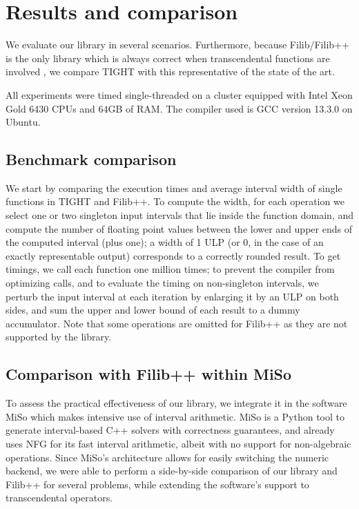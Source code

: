 \section{Results and comparison}
\label{sec:results}
We evaluate our library in several scenarios. Furthermore, because Filib/Filib++ is the only library which is always correct when transcendental functions are involved \cite{tang2022}, we compare TIGHT with this representative of the state of the art.

All experiments were timed single-threaded on a cluster equipped with Intel Xeon Gold 6430 CPUs and 64GB of RAM.
The compiler used is GCC version 13.3.0 on Ubuntu.

\subsection{Benchmark comparison}
We start by comparing the execution times and average interval width of single functions in TIGHT and Filib++.
To compute the width, for each operation we select one or two singleton input intervals that lie inside the function domain, and compute the number of floating point values between the lower and upper ends of the computed interval (plus one); a width of 1 ULP (or 0, in the case of an exactly representable output) corresponds to a correctly rounded result.
To get timings, we call each function one million times; to prevent the compiler from optimizing calls, and to evaluate the timing on non-singleton intervals, we perturb the input interval at each iteration by enlarging it by an ULP on both sides, and sum the upper and lower bound of each result to a dummy accumulator.
Note that some operations are omitted for Filib++ as they are not supported by the library.



\subsection{Comparison with Filib++ within MiSo}
To assess the practical effectiveness of our library, we integrate it in the software MiSo \cite{miso} which makes intensive use of interval arithmetic.
MiSo is a Python tool to generate interval-based C++ solvers with correctness guarantees, and already uses NFG for its fast interval arithmetic, albeit with no support for non-algebraic operations.
Since MiSo's architecture allows for easily switching the numeric backend, we were able to perform a side-by-side comparison of our library and Filib++ for several problems, while extending the software's support to transcendental operators.

